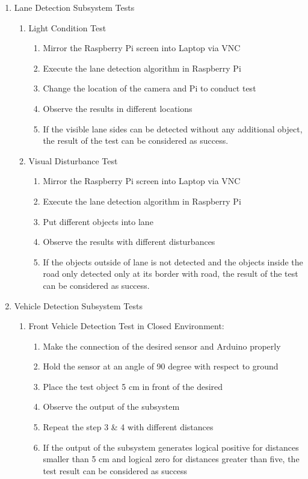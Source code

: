 \documentclass[a4paper,12pt]{article}
\begin{document}
\begin{enumerate}
	\begin{enumerate}
	\item {Lane Detection Subsystem Tests}	
	\begin{enumerate}
		\item{Light Condition Test}
				\begin{enumerate}
				\item Mirror the Raspberry Pi screen into Laptop via VNC  
				\item Execute the lane detection algorithm in Raspberry Pi 
				\item Change the location of the camera and Pi to conduct test 
				\item Observe the results in different locations   
				\item If the visible lane sides can be detected without any additional object, the result of the test can be considered as success. 
			\end{enumerate}
		\item{Visual Disturbance Test}
			\begin{enumerate}
			\item Mirror the Raspberry Pi screen into Laptop via VNC   
			\item Execute the lane detection algorithm in Raspberry Pi  
			\item Put different objects into lane  
			\item Observe the results with different disturbances 
			\item If the objects outside of lane is not detected and the objects inside the road only detected only at its border with road, the result of the test can be considered as success.  
		\end{enumerate}
	\end{enumerate}
	
	\item {Vehicle Detection Subsystem Tests}\label{sect:vhd}
		
		\begin{enumerate}
		
		\item Front Vehicle Detection Test in Closed Environment:
			\begin{enumerate}
				\item Make the connection of the desired sensor and Arduino properly  
				\item Hold the sensor at an angle of 90 degree with respect to ground  
				\item Place the test object 5 cm in front of the desired  
				\item Observe the output of the subsystem  
				\item Repeat the step 3 \& 4 with different distances  
				\item If the output of the subsystem generates logical positive for distances smaller than 5 cm and logical zero for distances greater than five, the test result can be considered as success  
			\end{enumerate}					
		

\end{enumerate}
\end{enumerate}
\end{enumerate}
\end{document}
